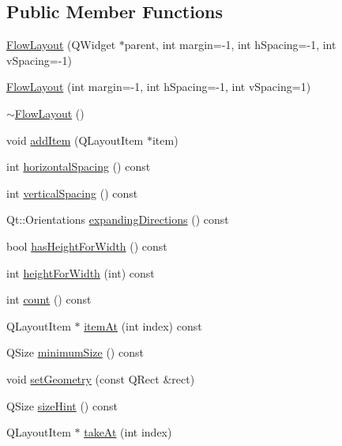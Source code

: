 \subsection*{Public Member Functions}
\begin{DoxyCompactItemize}
\item 
\hyperlink{class_flow_layout_afd3623cad3b02592123eb8a4dd01546f}{Flow\+Layout} (Q\+Widget $\ast$parent, int margin=-\/1, int h\+Spacing=-\/1, int v\+Spacing=-\/1)
\item 
\hyperlink{class_flow_layout_acce1c3b9a2b2d3a674cc9452fc77137c}{Flow\+Layout} (int margin=-\/1, int h\+Spacing=-\/1, int v\+Spacing=1)
\item 
\hyperlink{class_flow_layout_abcbfd03a4758b98bcf13d44f5e673551}{$\sim$\+Flow\+Layout} ()
\item 
void \hyperlink{class_flow_layout_a6a3f498fdac0145fe38838f31a6336cf}{add\+Item} (Q\+Layout\+Item $\ast$item)
\item 
int \hyperlink{class_flow_layout_a214d375a68a3590bf4b947e02eae09a3}{horizontal\+Spacing} () const 
\item 
int \hyperlink{class_flow_layout_a1b15dce81c6bce51290d3b55c35dcd3e}{vertical\+Spacing} () const 
\item 
Qt\+::\+Orientations \hyperlink{class_flow_layout_a2d2b5413e1e4eff15d23134208812a47}{expanding\+Directions} () const 
\item 
bool \hyperlink{class_flow_layout_a52203cd7f45648d9aee605b38daf4d87}{has\+Height\+For\+Width} () const 
\item 
int \hyperlink{class_flow_layout_af976e908e7bd74bd2ceff220739712a9}{height\+For\+Width} (int) const 
\item 
int \hyperlink{class_flow_layout_ae0d78c1e30b0bf5346e3ab94b80edeff}{count} () const 
\item 
Q\+Layout\+Item $\ast$ \hyperlink{class_flow_layout_a02d52a0e8ae5cf8672b2bb1537b896f2}{item\+At} (int index) const 
\item 
Q\+Size \hyperlink{class_flow_layout_a6e28537828ad1c477a299df5bc156212}{minimum\+Size} () const 
\item 
void \hyperlink{class_flow_layout_aa33b32ad4916b86b062d427860952d1e}{set\+Geometry} (const Q\+Rect \&rect)
\item 
Q\+Size \hyperlink{class_flow_layout_a7d52617e64c908d68dc1c75fbb549325}{size\+Hint} () const 
\item 
Q\+Layout\+Item $\ast$ \hyperlink{class_flow_layout_a55dad3061f24ea01069d6496e55d4aab}{take\+At} (int index)
\end{DoxyCompactItemize}

